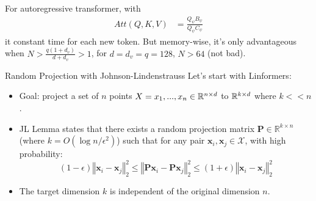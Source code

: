 \documentclass[aspectratio=169]{beamer}
\begin{document}
\begin{frame}
	For autoregressive transformer, with
	\begin{align*}
		Att(Q, K, V) & = \frac{Q_\psi B_\psi}{Q_\psi C_\psi}
	\end{align*}
	it constant time for each new token. But memory-wise, it's only advantageous when
	$N > \frac{q(1+d_v)}{d+d_v} > 1$, for $d=d_v =q= 128$, $N>64$ (not bad).

\end{frame}
%

\newcommand{\reals}{\mathbb{R}}
\newcommand{\set}[1]{\mathcal{#1}}
\newcommand{\norm}[1]{\left\Vert #1 \right\Vert_2} %
\newcommand{\innerprod}[2]{\left\langle #1, #2 \right\rangle}
\newcommand{\matr}[1]{\mathbf{#1}} %

\begin{frame}{Random Projection with Johnson-Lindenstrauss}
	Let's start with Linformers:
	\begin{itemize}
		\item Goal: project a set of $n$ points $X = {x_1, ..., x_n}\in\mathbb{R}^{n\times
		      d}$ to $\mathbb{R}^{k\times d}$ where $k << n$.
		\item JL Lemma states that there exists a random projection matrix
		      $\matr{P} \in \reals^{k \times n}$ (where $k = O(\log n /
		      \epsilon^2)$) such that for any pair $\matr{x}_i, \matr{x}_j \in
		      \set{X}$, with high probability: $$ (1 - \epsilon) \norm{\matr{x}_i -
		      \matr{x}_j}^2 \le \norm{\matr{P}\matr{x}_i - \matr{P}\matr{x}_j}^2
		      \le (1 + \epsilon) \norm{\matr{x}_i - \matr{x}_j}^2 $$
		\item The target dimension $k$ is independent of the original dimension
		      $n$.
	\end{itemize}

\end{frame}
\end{document}
